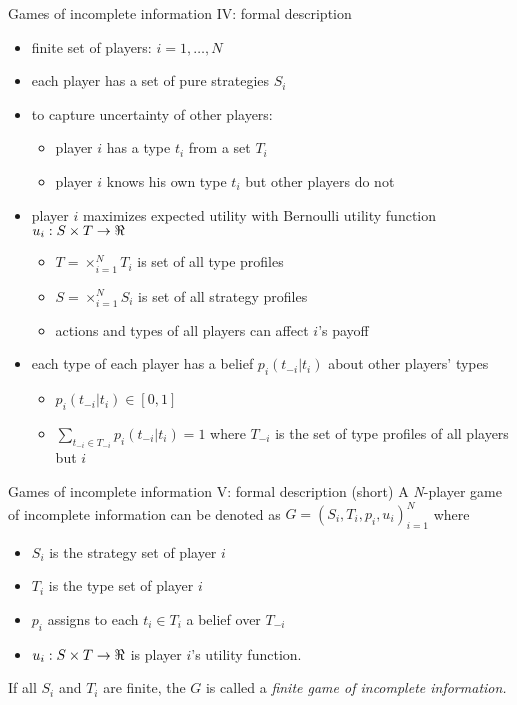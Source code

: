 \documentclass[bigger]{beamer}
\begin{document}
\begin{frame}[label={sec:orgfa73986}]{Games of incomplete information IV: formal description}
\begin{itemize}
\item finite set of players: \(i=1,\dots,N\)
\item each player has a set of pure strategies \(S_i\)
\item to capture uncertainty of other players:
\begin{itemize}
\item player \(i\) has a \alert{type} \(t_i\) from a set \(T_i\)
\item player \(i\) knows his own type \(t_i\) but other players do not
\end{itemize}
\item player \(i\) maximizes expected utility with Bernoulli utility function \(u_i:S\times T\rightarrow\Re\)
\begin{itemize}
\item \(T=\times_{i=1}^N T_i\) is set of all type profiles
\item \(S=\times_{i=1}^N S_i\) is set of all strategy profiles
\item actions and types of all players can affect \(i\)'s payoff
\end{itemize}
\item each type of each player has a belief \(p_i(t_{-i}|t_i)\) about other players' types
\begin{itemize}
\item \(p_i(t_{-i}|t_i)\in[0,1]\)
\item \(\sum_{t_{-i}\in T_{-i}}p_i(t_{-i}|t_i)=1\) where \(T_{-i}\) is the set of type profiles of all players but \(i\)
\end{itemize}
\end{itemize}
\end{frame}
\begin{frame}[label={sec:orgdc87d62}]{Games of incomplete information V:  formal description (short)}
A \emph{N}-player game of incomplete information can be denoted as \(G=(S_i,T_i,p_i,u_i)_{i=1}^N\) where
\begin{itemize}
\item \(S_i\) is the strategy set of player \(i\)
\item \(T_i\) is the type set of player \(i\)
\item \(p_i\) assigns to each \(t_i\in T_i\) a belief over \(T_{-i}\)
\item \(u_i:S\times T\rightarrow\Re\) is player \(i\)'s utility function.
\end{itemize}
If all \(S_i\) and \(T_i\) are finite, the \(G\) is called a \emph{finite game of incomplete information.}     
\end{frame}
\end{document}
